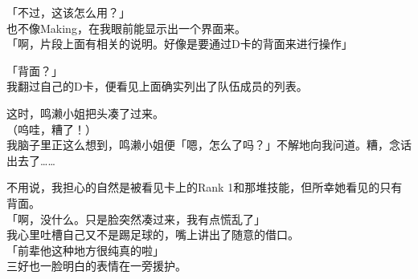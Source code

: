 「不过，这该怎么用？」\\

也不像Making，在我眼前能显示出一个界面来。\\

「啊，片段上面有相关的说明。好像是要通过D卡的背面来进行操作」

「背面？」\\

我翻过自己的D卡，便看见上面确实列出了队伍成员的列表。

这时，鸣濑小姐把头凑了过来。\\

（呜哇，糟了！）\\

我脑子里正这么想到，鸣濑小姐便「嗯，怎么了吗？」不解地向我问道。糟，念话出去了……

不用说，我担心的自然是被看见卡上的Rank 1和那堆技能，但所幸她看见的只有背面。\\

「啊，没什么。只是脸突然凑过来，我有点慌乱了」\\

我心里吐槽自己又不是踢足球的，嘴上讲出了随意的借口。\\

「前辈他这种地方很纯真的啦」\\

三好也一脸明白的表情在一旁援护。\\

